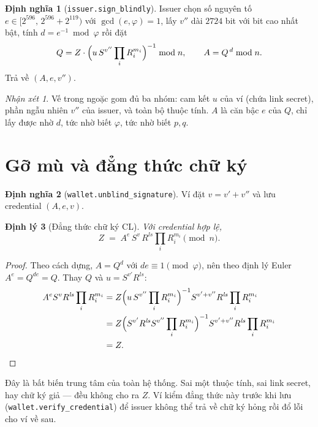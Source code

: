 \documentclass[a4paper,11pt]{article}
\theoremstyle{definition}
\newtheorem{definition}{Định nghĩa}[section]
\theoremstyle{plain}
\newtheorem{theorem}[definition]{Định lý}
\theoremstyle{remark}
\newtheorem*{remark}{Nhận xét}
\begin{document}
\begin{definition}[\texttt{issuer.sign\_blindly}]
Issuer chọn số nguyên tố $e \in [2^{596},\,2^{596}+2^{119})$ với $\gcd(e,\varphi)=1$, lấy
$v''$ dài $2724$ bit với bit cao nhất bật, tính $d=e^{-1}\bmod\varphi$ rồi đặt
\[
Q = Z \cdot \Bigl( u\, S^{v''} \prod_i R_i^{m_i} \Bigr)^{-1} \bmod n,
\qquad
A = Q^{\,d} \bmod n .
\]
Trả về $(A,e,v'')$.
\end{definition}

\begin{remark}
Vế trong ngoặc gom đủ ba nhóm: cam kết $u$ của ví (chứa link secret), phần ngẫu nhiên
$v''$ của issuer, và toàn bộ thuộc tính. $A$ là căn bậc $e$ của $Q$, chỉ lấy được nhờ
$d$, tức nhờ biết $\varphi$, tức nhờ biết $p,q$.
\end{remark}

\section{Gỡ mù và đẳng thức chữ ký}

\begin{definition}[\texttt{wallet.unblind\_signature}]
Ví đặt $v=v'+v''$ và lưu credential $(A,e,v)$.
\end{definition}

\begin{theorem}[Đẳng thức chữ ký CL]
\label{thm:cl}
Với credential hợp lệ,
\[
Z \;=\; A^{e}\, S^{v}\, R^{\mathit{ls}} \prod_i R_i^{m_i} \pmod n .
\]
\end{theorem}

\begin{proof}
Theo cách dựng, $A=Q^{d}$ với $d e \equiv 1 \pmod{\varphi}$, nên theo định lý Euler
$A^{e}=Q^{de}=Q$. Thay $Q$ và $u=S^{v'}R^{\mathit{ls}}$:
\begin{align*}
A^{e} S^{v} R^{\mathit{ls}} \prod_i R_i^{m_i}
&= Z\Bigl(u\,S^{v''}\prod_i R_i^{m_i}\Bigr)^{-1} S^{v'+v''} R^{\mathit{ls}} \prod_i R_i^{m_i}\\
&= Z\Bigl(S^{v'}R^{\mathit{ls}}S^{v''}\prod_i R_i^{m_i}\Bigr)^{-1}
   S^{v'+v''} R^{\mathit{ls}} \prod_i R_i^{m_i}\\
&= Z .\qedhere
\end{align*}
\end{proof}

\noindent Đây là bất biến trung tâm của toàn hệ thống. Sai một thuộc tính, sai link
secret, hay chữ ký giả --- đều không cho ra $Z$. Ví kiểm đẳng thức này trước khi lưu
(\texttt{wallet.verify\_credential}) để issuer không thể trả về chữ ký hỏng rồi đổ lỗi
cho ví về sau.
\end{document}
